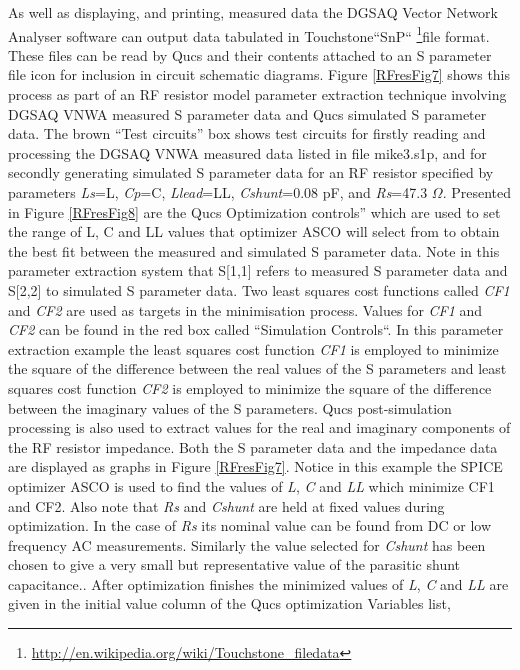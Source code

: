 As well as displaying, and printing, measured data the DGSAQ Vector Network Analyser software can output data tabulated in Touchstone\textcopyright ``SnP``
 \footnote{ \url{http://en.wikipedia.org/wiki/Touchstone_filedata} }file format.
These files can be read by Qucs and their contents attached to an S parameter file icon for inclusion in circuit schematic diagrams.
Figure \ref{RFresFig7} shows this process as part of an RF resistor model parameter extraction technique involving DGSAQ VNWA measured S parameter
data and Qucs simulated S parameter data.
The brown ``Test circuits'' box shows test circuits for firstly reading and processing the DGSAQ VNWA measured data listed in file mike3.s1p, and for secondly generating simulated
S parameter data for an RF resistor specified by parameters \textit{Ls}=L, \textit{Cp}=C, \textit{Llead}=LL, \textit{Cshunt}=0.08 pF, and \textit{Rs}=47.3 $\Omega$.
Presented in Figure \ref{RFresFig8} are the Qucs Optimization controls'' which are used to set the range of L, C and LL values that optimizer ASCO will select from to obtain the best fit
between the measured and simulated S parameter data.
Note in this parameter extraction system that S[1,1] refers to measured S parameter data and S[2,2] to simulated S parameter data.
Two least squares cost functions called \textit{CF1} and \textit{CF2} are used as targets in the minimisation process.
Values for \textit{CF1} and \textit{CF2} can be found in the red box called ``Simulation Controls``. In this parameter extraction example the least squares cost function \textit{CF1}
is employed to minimize the square of the difference between the real values of the S parameters and least squares cost function \textit{CF2} is employed to minimize the square of the
difference between the imaginary values of the S parameters.
Qucs post-simulation processing is also used to extract values for the real and imaginary components of the RF resistor impedance.
Both the S parameter data and the impedance data are displayed as graphs in Figure \ref{RFresFig7}.
Notice in this example the SPICE optimizer ASCO is used to find the values of \textit{L}, \textit{C} and \textit{LL} which minimize CF1 and CF2.
Also note that  \textit{Rs} and \textit{Cshunt} are held at fixed values during optimization.
In the case of \textit{Rs} its nominal value can be found from DC or low frequency AC measurements.
Similarly the value selected for \textit{Cshunt} has been chosen to give a very small but representative value of the parasitic shunt capacitance..
After optimization finishes the minimized values of \textit{L}, \textit{C} and \textit{LL} are given in the initial value column of the Qucs optimization Variables list,
